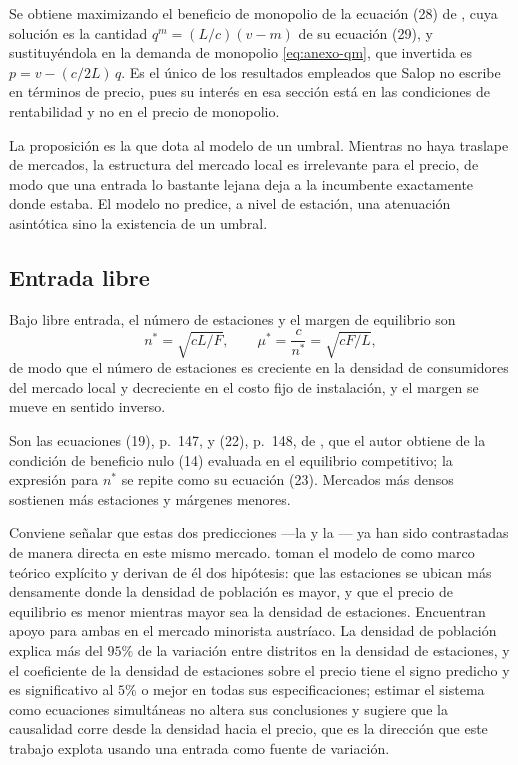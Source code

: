 Se obtiene maximizando el beneficio de monopolio de la ecuación (28) de
\textcite[151]{SALOP1979}, cuya solución es la cantidad $q^{m}=(L/c)(v-m)$ de su
ecuación (29), y sustituyéndola en la demanda de monopolio
\eqref{eq:anexo-qm}, que invertida es $p = v - (c/2L)\,q$. Es el único de los
resultados empleados que Salop no escribe en términos de precio, pues su interés
en esa sección está en las condiciones de rentabilidad y no en el precio de
monopolio.

La proposición es la que dota al modelo de un umbral. Mientras no haya traslape
de mercados, la estructura del mercado local es irrelevante para el precio, de
modo que una entrada lo bastante lejana deja a la incumbente exactamente donde
estaba. El modelo no predice, a nivel de estación, una atenuación asintótica sino
la existencia de un umbral.

\subsection{Entrada libre}

\begin{proposicion}
\label{prop:libre}
Bajo libre entrada, el número de estaciones y el margen de equilibrio son
\begin{equation}
    n^{*} = \sqrt{cL/F} ,
    \qquad
    \mu^{*} = \frac{c}{n^{*}} = \sqrt{cF/L} ,
    \label{eq:entrada-libre}
\end{equation}
de modo que el número de estaciones es creciente en la densidad de consumidores
del mercado local y decreciente en el costo fijo de instalación, y el margen se
mueve en sentido inverso.
\end{proposicion}

Son las ecuaciones (19), p.~147, y (22), p.~148, de \textcite{SALOP1979}, que el
autor obtiene de la condición de beneficio nulo (14) evaluada en el equilibrio
competitivo; la expresión para $n^{*}$ se repite como su ecuación (23). Mercados
más densos sostienen más estaciones y márgenes menores.

Conviene señalar que estas dos predicciones —la  y la
— ya han sido contrastadas de manera directa en este mismo
mercado. \textcite{CLEMENZGUGLER2006} toman el modelo de \textcite{SALOP1979}
como marco teórico explícito y derivan de él dos hipótesis: que las estaciones se
ubican más densamente donde la densidad de población es mayor, y que el precio de
equilibrio es menor mientras mayor sea la densidad de estaciones. Encuentran
apoyo para ambas en el mercado minorista austríaco. La densidad de población
explica más del $95\%$ de la variación entre distritos en la densidad de
estaciones, y el coeficiente de la densidad de estaciones sobre el precio tiene el
signo predicho y es significativo al $5\%$ o mejor en todas sus especificaciones;
estimar el sistema como ecuaciones simultáneas no altera sus conclusiones y
sugiere que la causalidad corre desde la densidad hacia el precio, que es la
dirección que este trabajo explota usando una entrada como fuente de variación.

